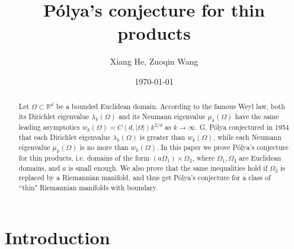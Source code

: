 \documentclass[11pt,letterpaper]{amsart}
\numberwithin{equation}{section}
\theoremstyle{plain}
\theoremstyle{plain}
\numberwithin{equation}{section}
\theoremstyle{remark}
\begin{document}
	\date{\today}
	
	\title
	{P\'olya's conjecture for thin products}
	
	
	\author{Xiang He, Zuoqin Wang}
	\address{Yau Mathematical Sciences Center\\
		Tsinghua University\\
		Beijing, 100084\\ P.R. China\\}
	
	\address{School of Mathematical Sciences\\
		University of Science and Technology of China\\
		Hefei, 230026\\ P.R. China\\}
	
	
	\begin{abstract}
		Let $\Omega \subset \mathbb R^d$ be a bounded Euclidean domain.  According to the famous Weyl law, both its Dirichlet eigenvalue $\lambda_k(\Omega)$ and its Neumann eigenvalue $\mu_k(\Omega)$ have the same leading asymptotics $w_k(\Omega)=C(d,|\Omega|)k^{2/d}$ as $k \to \infty$. G. P\'olya conjectured in 1954 that each Dirichlet eigenvalue $\lambda_k(\Omega)$ is greater than $w_k(\Omega)$, while each  Neumann eigenvalue $\mu_k(\Omega)$ is no more than $w_k(\Omega)$. In this paper we prove P\'olya's conjecture for  thin products, i.e.   domains of the form $(a\Omega_1) \times \Omega_2$, where $\Omega_1, \Omega_2$ are Euclidean domains, and $a$ is small enough. We also prove that the same inequalities hold if $\Omega_2$ is replaced by a Riemannian manifold, and thus get P\'olya's conjecture for a class of ``thin" Riemannian manifolds with boundary.  
	\end{abstract}
	\maketitle
	
	\section{Introduction}
	
\end{document}
